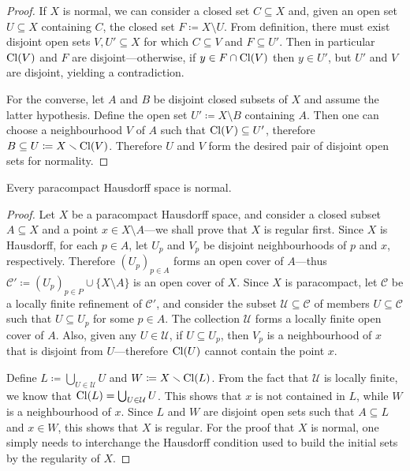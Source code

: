 \begin{proof}
    If \(X\) is normal, we can consider a closed set \(C \subseteq X\) and, given an
    open set \(U \subseteq X\) containing \(C\), the closed set
    \(F \coloneq X \setminus U\). From definition, there must exist disjoint open
    sets \(V, U' \subseteq X\) for which \(C \subseteq V\) and \(F \subseteq
    U'\). Then in particular \(\operatorname{Cl}(V)\) and \(F\) are disjoint---otherwise, if
    \(y \in F \cap \operatorname{Cl}(V)\) then \(y \in U'\), but \(U'\) and \(V\) are disjoint,
    yielding a contradiction.

    For the converse, let \(A\) and \(B\) be disjoint closed subsets of \(X\) and
    assume the latter hypothesis. Define the open set \(U' \coloneq X \setminus B\)
    containing \(A\). Then one can choose a neighbourhood \(V\) of \(A\) such that
    \(\operatorname{Cl}(V) \subseteq U'\), therefore
    \(B \subseteq U \coloneq X \smallsetminus \operatorname{Cl}(V)\). Therefore \(U\) and \(V\) form
    the desired pair of disjoint open sets for normality.
\end{proof}

\begin{theorem}
    \label{thm:paracompact-hausdorff-is-normal}
    Every paracompact Hausdorff space is normal.
\end{theorem}

\begin{proof}
    Let \(X\) be a paracompact Hausdorff space, and consider a closed subset
    \(A \subseteq X\) and a point \(x \in X \setminus A\)---we shall prove that
    \(X\) is regular first. Since \(X\) is Hausdorff, for each \(p \in A\), let
    \(U_p\) and \(V_p\) be disjoint neighbourhoods of \(p\) and \(x\),
    respectively. Therefore \((U_p)_{p \in A}\) forms an open cover of \(A\)---thus
    \(\mathcal{C}' \coloneq (U_p)_{p \in P} \cup \{X \setminus A\}\) is an open
    cover of \(X\). Since \(X\) is paracompact, let \(\mathcal{C}\) be a locally
    finite refinement of \(\mathcal{C}'\), and consider the subset
    \(\mathcal{U} \subseteq \mathcal{C}\) of members \(U \subseteq \mathcal{C}\)
    such that \(U \subseteq U_p\) for some \(p \in A\). The collection
    \(\mathcal{U}\) forms a locally finite open cover of \(A\). Also, given any \(U
    \in \mathcal{U}\), if \(U \subseteq U_p\), then \(V_p\) is a neighbourhood of
    \(x\) that is disjoint from \(U\)---therefore \(\operatorname{Cl}(U)\) cannot contain the
    point \(x\).

    Define \(L \coloneq \bigcup_{U \in \mathcal{U}} U\) and \(W \coloneq X \smallsetminus
    \operatorname{Cl}(L)\). From the fact that \(\mathcal{U}\) is locally finite, we know that
    \(\operatorname{Cl}(L) = \bigcup_{U \in \mathcal{U}} U\). This shows that \(x\) is not
    contained in \(L\), while \(W\) is a neighbourhood of \(x\). Since \(L\) and
    \(W\) are disjoint open sets such that \(A \subseteq L\) and \(x \in W\), this
    shows that \(X\) is regular. For the proof that \(X\) is normal, one simply
    needs to interchange the Hausdorff condition used to build the initial sets by
    the regularity of \(X\).
\end{proof}

